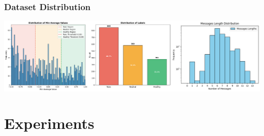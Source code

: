 \documentclass[aspectratio=169]{beamer}
\begin{document}
\begin{frame}
  \frametitle{Dataset Distribution}
  \centering
  \includegraphics[width=\textwidth]{rsc/multiclass_distributions.png}
\end{frame}

\section{Experiments}


  
\end{document}
